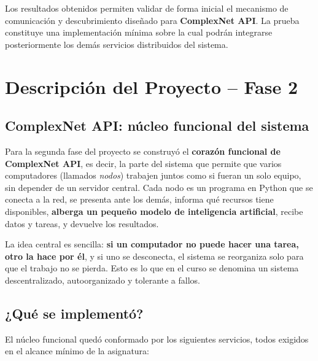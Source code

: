 \documentclass{article}
\begin{document}
Los resultados obtenidos permiten validar de forma inicial el mecanismo de comunicación y descubrimiento diseñado para \textbf{ComplexNet API}. La prueba constituye una implementación mínima sobre la cual podrán integrarse posteriormente los demás servicios distribuidos del sistema.

\section{Descripción del Proyecto -- Fase 2}

\subsection{ComplexNet API: núcleo funcional del sistema}

Para la segunda fase del proyecto se construyó el \textbf{corazón funcional de ComplexNet API}, es decir, la parte del sistema que permite que varios computadores (llamados \textit{nodos}) trabajen juntos como si fueran un solo equipo, sin depender de un servidor central. Cada nodo es un programa en Python que se conecta a la red, se presenta ante los demás, informa qué recursos tiene disponibles, \textbf{alberga un pequeño modelo de inteligencia artificial}, recibe datos y tareas, y devuelve los resultados.

La idea central es sencilla: \textbf{si un computador no puede hacer una tarea, otro la hace por él}, y si uno se desconecta, el sistema se reorganiza solo para que el trabajo no se pierda. Esto es lo que en el curso se denomina un sistema descentralizado, autoorganizado y tolerante a fallos.

\newpage

\subsection{¿Qué se implementó?}

El núcleo funcional quedó conformado por los siguientes servicios, todos exigidos en el alcance mínimo de la asignatura:
\end{document}
